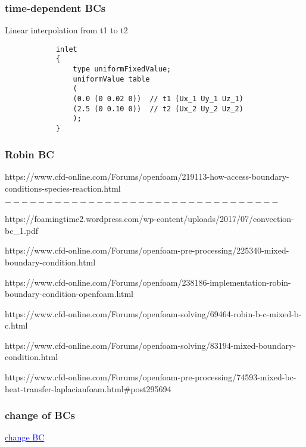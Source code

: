 \documentclass[a4paper, 12pt]{article}
\numberwithin{equation}{section}
\newcommand{\blue}[1]{\textcolor{blue}{#1}}
\begin{document}
        \subsubsection{time-dependent BCs}

            Linear interpolation from t1 to t2

            {
            \begin{verbatim}
            inlet
            {
                type uniformFixedValue;
                uniformValue table
                (
                (0.0 (0 0.02 0))  // t1 (Ux_1 Uy_1 Uz_1)
                (2.5 (0 0.10 0))  // t2 (Ux_2 Uy_2 Uz_2)
                );
            }
            \end{verbatim}
            }

        \subsubsection{Robin BC}

            https://www.cfd-online.com/Forums/openfoam/219113-how-access-boundary-conditions-species-reaction.html

            $---------------------------------$

            https://foamingtime2.wordpress.com/wp-content/uploads/2017/07/convection-bc\_1.pdf

            https://www.cfd-online.com/Forums/openfoam-pre-processing/225340-mixed-boundary-condition.html

            https://www.cfd-online.com/Forums/openfoam/238186-implementation-robin-boundary-condition-openfoam.html

            https://www.cfd-online.com/Forums/openfoam-solving/69464-robin-b-c-mixed-b-c.html

            https://www.cfd-online.com/Forums/openfoam-solving/83194-mixed-boundary-condition.html

            https://www.cfd-online.com/Forums/openfoam-pre-processing/74593-mixed-bc-heat-transfer-laplacianfoam.html\#post295694

        \subsubsection{change of BCs}

            \href{https://www.cfd-online.com/Forums/openfoam-solving/235527-how-change-boundary-condition-after-specific-timein-parallel-solver.html}{\blue{change BC}}
\end{document}
